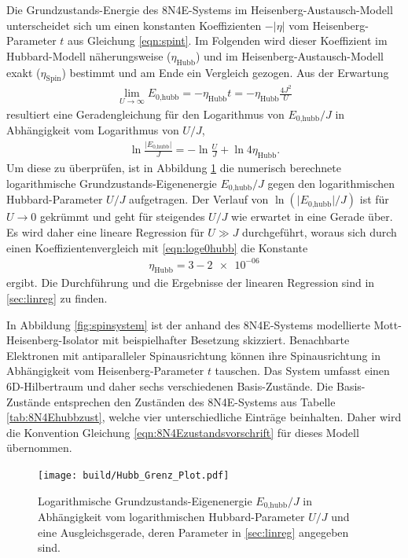Die Grundzustands-Energie des 8N4E-Systems im Heisenberg-Austausch-Modell unterscheidet sich um einen konstanten Koeffizienten $-\lvert \eta \rvert$ vom Heisenberg-Parameter $t$ aus Gleichung \eqref{eqn:spint}.
Im Folgenden wird dieser Koeffizient im Hubbard-Modell näherungsweise ($\eta_\text{Hubb}$) und im Heisenberg-Austausch-Modell exakt ($\eta_\text{Spin}$) bestimmt und am Ende ein Vergleich gezogen.
Aus der Erwartung
\begin{align}
  \lim\limits_{U \to \infty} E_\text{0,hubb} = -\eta_\text{Hubb} t = -\eta_\text{Hubb} \frac{4 J^2}{U}
\end{align}
resultiert eine Geradengleichung für den Logarithmus von $E_\text{0,hubb}/J$ in Abhängigkeit vom Logarithmus von $U/J$,
\begin{align}
  \ln{\frac{\lvert E_\text{0,hubb}\rvert}{J}} = -\ln{\frac{U}{J}} + \ln{4 \eta_\text{Hubb}}.
  \label{eqn:loge0hubb}
\end{align}
Um diese zu überprüfen, ist in Abbildung \ref{fig:loglog} die numerisch berechnete logarithmische Grundzustands-Eigenenergie $E_\text{0,hubb}/J$ gegen den logarithmischen Hubbard-Parameter $U/J$ aufgetragen.
Der Verlauf von $\ln \left(\lvert E_\text{0,hubb} \rvert/J \right)$ ist für $U \to 0$ gekrümmt und geht für steigendes $U/J$ wie erwartet in eine Gerade über.
Es wird daher eine lineare Regression für $U \gg J$ durchgeführt, woraus sich durch einen Koeffizientenvergleich mit \eqref{eqn:loge0hubb} die Konstante
\begin{align}
  \eta_\text{Hubb} = 3 - \num{2e-06}
  \label{eqn:eta1}
\end{align}
ergibt. Die Durchführung und die Ergebnisse der linearen Regression sind in \ref{sec:linreg} zu finden.

In Abbildung \ref{fig:spinsystem} ist der anhand des 8N4E-Systems modellierte Mott-Heisenberg-Isolator mit beispielhafter Besetzung skizziert.
Benachbarte Elektronen mit antiparalleler Spinausrichtung können ihre Spinausrichtung in Abhängigkeit vom Heisenberg-Parameter $t$ tauschen.
Das System umfasst einen 6D-Hilbertraum und daher sechs verschiedenen Basis-Zustände. Die Basis-Zustände entsprechen den Zuständen des 8N4E-Systems aus Tabelle \ref{tab:8N4Ehubbzust}, welche vier unterschiedliche Einträge beinhalten.
Daher wird die Konvention Gleichung \eqref{eqn:8N4Ezustandsvorschrift} für dieses Modell übernommen.
\newpage
\begin{figure}[H]
  \centering
  \texttt{[image: build/Hubb\_Grenz\_Plot.pdf]}
  \caption{Logarithmische Grundzustands-Eigenenergie $E_\text{0,hubb}/J$ in Abhängigkeit vom logarithmischen Hubbard-Parameter $U/J$ und eine Ausgleichsgerade, deren Parameter in \ref{sec:linreg} angegeben sind.}
  \label{fig:loglog}
\end{figure}

